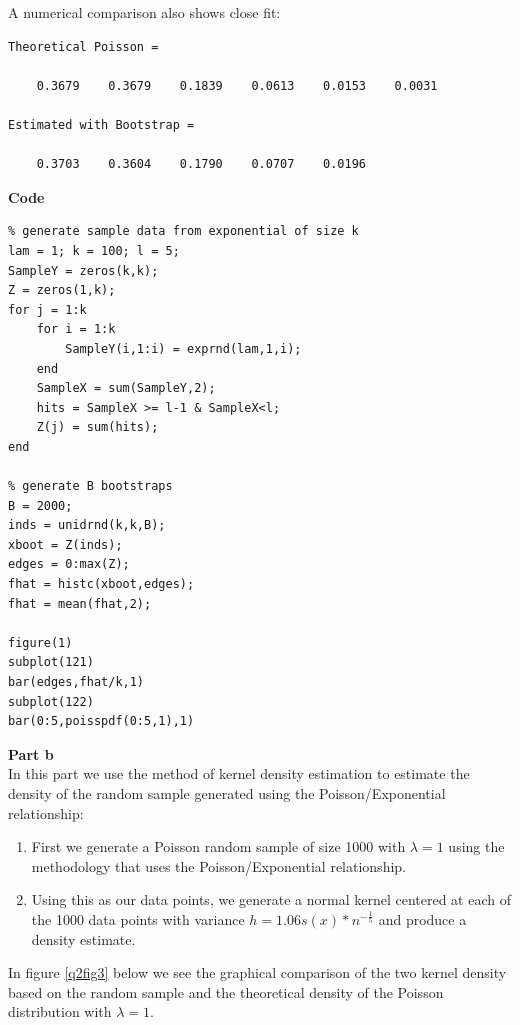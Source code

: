 \documentclass[12pt,a4paper]{article}
\begin{document}
A numerical comparison also shows close fit:
\begin{verbatim}
Theoretical Poisson =

    0.3679    0.3679    0.1839    0.0613    0.0153    0.0031
    
Estimated with Bootstrap =

    0.3703    0.3604    0.1790    0.0707    0.0196
\end{verbatim}
\clearpage
\textbf{Code}
\begin{verbatim}
% generate sample data from exponential of size k
lam = 1; k = 100; l = 5;
SampleY = zeros(k,k);
Z = zeros(1,k);
for j = 1:k
    for i = 1:k
        SampleY(i,1:i) = exprnd(lam,1,i);
    end
    SampleX = sum(SampleY,2);
    hits = SampleX >= l-1 & SampleX<l;
    Z(j) = sum(hits);
end

% generate B bootstraps
B = 2000;
inds = unidrnd(k,k,B);
xboot = Z(inds);
edges = 0:max(Z);
fhat = histc(xboot,edges);
fhat = mean(fhat,2);

figure(1)
subplot(121)
bar(edges,fhat/k,1)
subplot(122)
bar(0:5,poisspdf(0:5,1),1)
\end{verbatim}
\clearpage
\textbf{Part b}\\
In this part we use the method of kernel density estimation to estimate the density of the random sample generated using the Poisson/Exponential relationship:
\begin{enumerate}
\item{First we generate a Poisson random sample of size 1000 with $\lambda=1$ using the methodology that uses the Poisson/Exponential relationship.}
\item{Using this as our data points, we generate a normal kernel centered at each of the 1000 data points with variance $h=1.06s(x)*n^{-\frac{1}{5}}$ and produce a density estimate.}
\end{enumerate}

In figure \ref{q2fig3} below we see the graphical comparison of the two kernel density based on the random sample and the theoretical density of the Poisson distribution with $\lambda=1$. 
\end{document}
